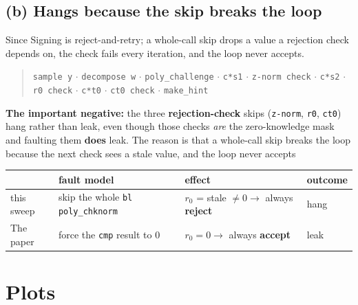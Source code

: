 \documentclass[11pt]{article}
\newcommand{\code}[1]{\texttt{#1}}
\begin{document}
\subsection{(b) Hangs because the skip breaks the loop}

Since Signing is reject-and-retry; a
whole-call skip drops a value a rejection check depends on, the check fails every
iteration, and the loop never accepts.

\begin{quote}
\code{sample y} $\cdot$ \code{decompose w} $\cdot$ \code{poly\_challenge}
$\cdot$ \code{c*s1} $\cdot$ \code{z-norm check} $\cdot$ \code{c*s2} $\cdot$
\code{r0 check} $\cdot$ \code{c*t0} $\cdot$ \code{ct0 check} $\cdot$
\code{make\_hint}
\end{quote}

\noindent\textbf{The important negative:} the three \textbf{rejection-check}
skips (\code{z-norm}, \code{r0}, \code{ct0}) hang rather than leak, even
though those checks \emph{are} the zero-knowledge mask and faulting them
\textbf{does} leak. The reason is that a whole-call skip breaks the loop because the next check sees a stale value, and the loop never accepts

\begin{table}[h]
\centering
\begin{tabular}{@{}llll@{}}
\toprule
 & fault model & effect & outcome \\
\midrule
this sweep & skip the whole \code{bl poly\_chknorm} & $r_0$ = stale $\neq 0 \to$
always \textbf{reject} & hang \\
The paper & force the \code{cmp} result to 0 & $r_0 = 0 \to$ always
\textbf{accept} & leak \\
\bottomrule
\end{tabular}
\end{table}



\section{Plots}
\end{document}
